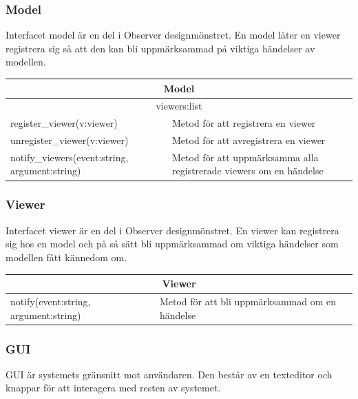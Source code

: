 \subsubsection{Model}
Interfacet model är en del i Observer designmönstret. En model låter en viewer registrera sig så att den kan bli uppmärksammad  på viktiga händelser av modellen.


\begin{tabular}{|l|p{10 cm}|}
\hline
\multicolumn{2}{|c|}{\textbf{Model}} \\
\hline
\multicolumn{2}{|c|}{viewers:list} \\
\hline
register\_viewer(v:viewer) & Metod för att registrera en viewer\\
unregister\_viewer(v:viewer) & Metod för att avregistrera en viewer\\
notify\_viewers(event:string, argument:string) & Metod för att uppmärksamma alla registrerade
viewers om en händelse\\
\hline
\end{tabular}

\subsubsection{Viewer}
Interfacet viewer är en del i Observer designmönstret. En viewer kan registrera sig hos en model och på så sätt bli uppmärksammad om viktiga händelser som modellen fått kännedom om.


\begin{tabular}{|l|p{10 cm}|}
\hline
\multicolumn{2}{|c|}{\textbf{Viewer}} \\
\hline
\hline
notify(event:string, argument:string) & Metod för att bli uppmärksammad om en händelse\\
\hline
\end{tabular}

\subsubsection{GUI}
GUI är systemets gränsnitt mot användaren. Den består av en texteditor och knappar för att interagera med resten av systemet.


